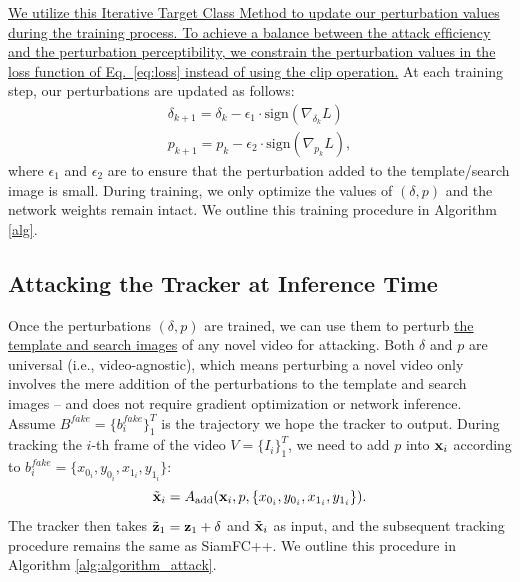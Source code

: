 \documentclass[journal]{IEEEtran}
\newcommand{\ie}{i.e.}
\begin{document}
\uline{We utilize this Iterative Target Class Method to update our perturbation values during the training process. To achieve a balance between the attack efﬁciency and the perturbation perceptibility, we constrain the perturbation values in the loss function of Eq.~\eqref{eq:loss} instead of using the clip operation.}
At each training step, our perturbations are updated as follows:
\begin{gather}
\delta_{k+1} = \delta_{k} - \epsilon_1 \cdot \text{sign}(\nabla_{\delta_k}L)\\
p_{k+1} = p_{k} - \epsilon_2 \cdot \text{sign}(\nabla_{p_k}L),
\end{gather}
where $\epsilon_1$ and $\epsilon_2$ are to ensure that the perturbation added to the template/search image is small.
During training, we only optimize the values of $(\delta, p)$ and the network weights remain intact. We outline this training procedure in Algorithm \ref{alg}.

\subsection{Attacking the Tracker at Inference Time}

Once the perturbations $(\delta, p)$ are trained, we can use them to perturb \uline{the template and search images} of any novel video for attacking. Both $\delta$ and $p$ are universal (\ie, video-agnostic), which means perturbing a novel video only involves the mere addition of the perturbations to the template and search images -- and does not require gradient optimization or network inference.
Assume $B^{fake}=\{b^{fake}_i\}_1^{T}$ is the trajectory we hope the tracker to output.
During tracking the $i$-th frame of the video $V=\{I_i\}_1^T$, we need to add $p$ into $\textbf x_i$ according to $b^{fake}_i=\{x_{0_i}, y_{0_i}, x_{1_i}, y_{1_i}\}$:
\begin{equation}
\tilde{\textbf x}_i = A_{\text{add}}(\textbf x_i, p, \{x_{0_i}, y_{0_i}, x_{1_i}, y_{1_i}\}).
\end{equation}
The tracker then takes $\tilde{\textbf z}_1=\textbf z_1+\delta$ and $\tilde{ \textbf x}_i$ as input, and the subsequent tracking procedure remains the same as SiamFC++.
We outline this procedure in Algorithm \ref{alg:algorithm_attack}.
\end{document}
